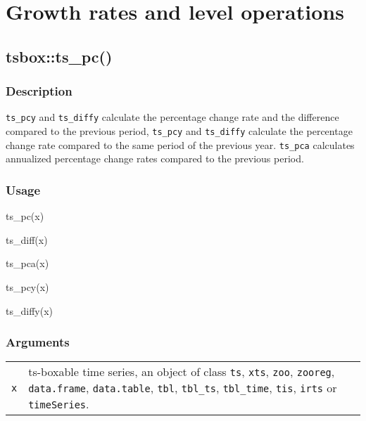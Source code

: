 \documentclass[
  letterpaper,
  DIV=11,
  numbers=noendperiod]{scrreport}
\newenvironment{Shaded}{\begin{snugshade}}{\end{snugshade}}
\newcommand{\FunctionTok}[1]{\textcolor[rgb]{0.28,0.35,0.67}{#1}}
\newcommand{\NormalTok}[1]{\textcolor[rgb]{0.00,0.23,0.31}{#1}}
\begin{document}
\section{Growth rates and level
operations}\label{growth-rates-and-level-operations}

\subsection{tsbox::ts\_pc()}\label{tsboxts_pc}

\subsubsection{Description}\label{description-29}

\texttt{ts\_pcy} and \texttt{ts\_diffy} calculate the percentage change
rate and the difference compared to the previous period,
\texttt{ts\_pcy} and \texttt{ts\_diffy} calculate the percentage change
rate compared to the same period of the previous year. \texttt{ts\_pca}
calculates annualized percentage change rates compared to the previous
period.

\subsubsection{Usage}\label{usage-29}

\begin{Shaded}
\begin{Highlighting}[]
\FunctionTok{ts\_pc}\NormalTok{(x)}

\FunctionTok{ts\_diff}\NormalTok{(x)}

\FunctionTok{ts\_pca}\NormalTok{(x)}

\FunctionTok{ts\_pcy}\NormalTok{(x)}

\FunctionTok{ts\_diffy}\NormalTok{(x)}
\end{Highlighting}
\end{Shaded}

\subsubsection{Arguments}\label{arguments-29}

\begin{longtable}[]{@{}ll@{}}
\toprule\noalign{}
\endhead
\bottomrule\noalign{}
\endlastfoot
\texttt{x} & ts-boxable time series, an object of class \texttt{ts},
\texttt{xts}, \texttt{zoo}, \texttt{zooreg}, \texttt{data.frame},
\texttt{data.table}, \texttt{tbl}, \texttt{tbl\_ts}, \texttt{tbl\_time},
\texttt{tis}, \texttt{irts} or \texttt{timeSeries}. \\
\end{longtable}
\end{document}
